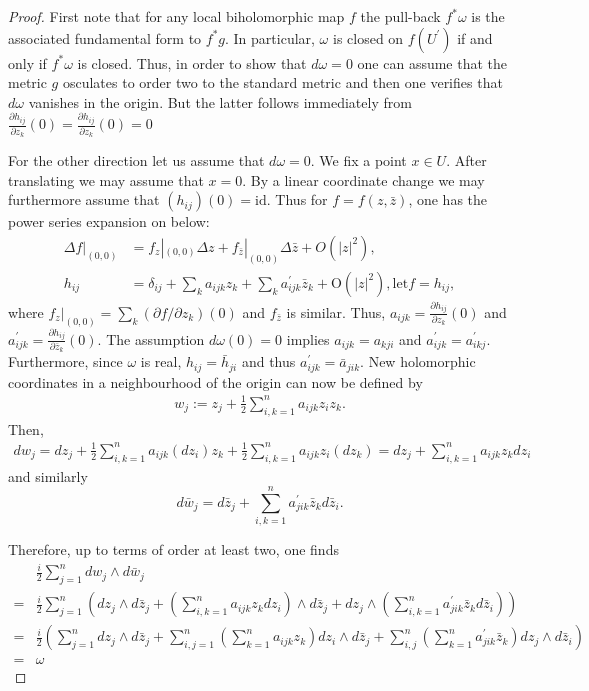 \begin{proof}
  First note that for any local biholomorphic map $f$ the pull-back $f^* \omega$ is the associated fundamental form to $f^* g$. In particular, $\omega$ is closed on $f\left(U^{\prime}\right)$ if and only if $f^* \omega$ is closed. Thus, in order to show that $d \omega=0$ one can assume that the metric $g$ osculates to order two to the standard metric and then one verifies that $d \omega$ vanishes in the origin. But the latter follows immediately from $\frac{\partial h_{i j}}{\partial z_k}(0)=\frac{\partial h_{i j}}{\partial z_k}(0)=0$

For the other direction let us assume that $d \omega=0$. We fix a point $x \in U$. After translating we may assume that $x=0$. By a linear coordinate change we may furthermore assume that $\left(h_{i j}\right)(0)= \mathrm{id}$. Thus for $f=f(z,\bar{z})$, one has the power series expansion on below:
\begin{align*}
\Delta f|_{(0,0)}&=f_z |_{(0,0)}\Delta z+f_{\bar{z}} |_{(0,0)} \Delta \bar{z}+O(|z|^2),\\
h_{i j}&=\delta_{i j}+\sum_k a_{i j k} z_k+\sum_k a_{i j k}^{\prime} \bar{z}_k+\mathrm{O}\left(|z|^2\right), \text{let} f=h_{ij},
\end{align*}
where $f_z |_{(0,0)}=\sum_{k} \left(\partial f/\partial z_k\right) (0)$ and $f_{\bar{z}}$ is similar. Thus, $a_{i j k}=\frac{\partial h_{i j}}{\partial z_k}(0)$ and $a_{i j k}^{\prime}=\frac{\partial h_{i j}}{\partial \bar{z}_k}(0)$. The assumption $d \omega(0)=0$ implies $a_{i j k}=a_{k j i}$ and $a_{i j k}^{\prime}=a_{i k j}^{\prime}$. Furthermore, since $\omega$ is real, $h_{i j}=\bar{h}_{j i}$ and thus $a_{i j k}^{\prime}=\bar{a}_{j i k}$. New holomorphic coordinates in a neighbourhood of the origin can now be defined by
\begin{align*}
w_j:=z_j+\frac{1}{2} \sum_{i, k=1}^n a_{i j k} z_i z_k .
\end{align*}
Then, 
\begin{align*}
d w_j=d z_j+\frac{1}{2} \sum_{i, k=1}^n a_{i j k}\left(d z_i\right) z_k+\frac{1}{2} \sum_{i, k=1}^n a_{i j k} z_i\left(d z_k\right)=d z_j+\sum_{i, k=1}^n a_{i j k} z_k d z_i
\end{align*}
 and similarly $$d \bar{w}_j=d \bar{z}_j+\sum_{i, k=1}^n a_{j i k}^{\prime} \bar{z}_k d \bar{z}_i.$$ 

Therefore, up to terms of order at least two, one finds
\begin{align*}
& \frac{i}{2} \sum_{j=1}^n d w_j \wedge d \bar{w}_j \\
= & \frac{i}{2} \sum_{j=1}^n\left(d z_j \wedge d \bar{z}_j+\left(\sum_{i, k=1}^n a_{i j k} z_k d z_i\right) \wedge d \bar{z}_j+d z_j \wedge\left(\sum_{i, k=1}^n a_{j i k}^{\prime} \bar{z}_k d \bar{z}_i\right)\right) \\
= & \frac{i}{2}\left(\sum_{j=1}^n d z_j \wedge d \bar{z}_j+\sum_{i, j=1}^n\left(\sum_{k=1}^n a_{i j k} z_k\right) d z_i \wedge d \bar{z}_j+\sum_{i, j}^n\left(\sum_{k=1}^n a_{j i k}^{\prime} \bar{z}_k\right) d z_j \wedge d \bar{z}_i\right) \\
= & \omega
\end{align*}
\end{proof} 
